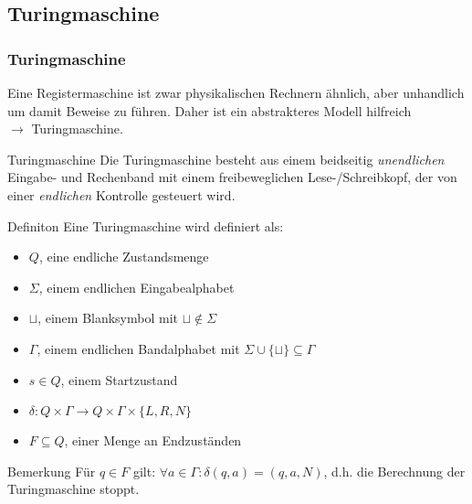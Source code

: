 \documentclass{beamer}
\begin{document}
{\subsection{Turingmaschine}
\begin{frame}
\frametitle{Turingmaschine}
Eine Registermaschine ist zwar physikalischen Rechnern ähnlich, aber unhandlich um damit Beweise zu führen.
Daher ist ein abstrakteres Modell hilfreich \\
$\rightarrow$ Turingmaschine.
\pause
\begin{block}{Turingmaschine}
Die Turingmaschine besteht aus einem beidseitig \emph{unendlichen} Eingabe- und Rechenband
mit einem freibeweglichen Lese-/Schreibkopf, der von einer \emph{endlichen} Kontrolle gesteuert wird. 
\end{block}
\end{frame}
\begin{frame}
\vspace{-1cm}
\begin{block}{Definiton}
Eine Turingmaschine wird definiert als:
 \begin{itemize}
 \item $Q$, eine endliche Zustandsmenge
 \item $\Sigma$, einem endlichen Eingabealphabet
 \item $\sqcup$, einem Blanksymbol mit $\sqcup \notin \Sigma$
 \item $\Gamma$, einem endlichen Bandalphabet mit $\Sigma \cup\{\sqcup\} \subseteq \Gamma$
 \item $s \in Q$, einem Startzustand
 \item $\delta: Q\times\Gamma \rightarrow Q\times\Gamma\times\{L, R, N\}$
 \item $F \subseteq Q$, einer Menge an Endzuständen
 \end{itemize}
\end{block}
\begin{block}{Bemerkung}
 Für $q\in F$ gilt: $\forall a \in \Gamma: \delta(q, a) = (q, a, N)$, d.h. die Berechnung der Turingmaschine stoppt.
\end{block}
\end{frame}

}
\end{document}
